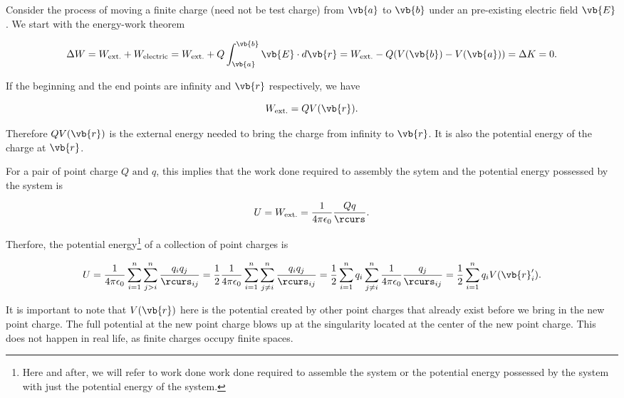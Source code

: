 \documentclass[english,a4paper,12pt]{report}
\begin{document}
Consider the process of moving a finite charge (need not be test charge) from \(\vb{a} \) to \(\vb{b} \) under an pre-existing electric field \(\vb{E} \). We start with the energy-work theorem

\begin{equation}
    \Delta W = W_{\text{ext.}} + W_{\text{electric}} = W_{\text{ext.}} + Q \int_{\vb{a} }^{\vb{b} } \vb{E} \cdot d\vb{r} = W_{\text{ext.}} - Q (V(\vb{b} ) - V(\vb{a} )) = \Delta K = 0.    
\end{equation}

If the beginning and the end points are infinity and \(\vb{r} \) respectively, we have

\begin{equation}
    W_{\text{ext.}} = QV(\vb{r} ). 
\end{equation}

Therefore \(QV(\vb{r} )\) is the external energy needed to bring the charge from infinity to \(\vb{r} \). It is also the potential energy of the charge at \(\vb{r} \). 

For a pair of point charge \(Q \text { and } q\), this implies that the work done required to assembly the sytem and the potential energy possessed by the system is 

\begin{equation}
    U = W_{\text{ext.}} = \frac{1}{4\pi \epsilon_0} \frac{Qq}{\rcurs }.
\end{equation}

Therfore, the potential energy\footnote{Here and after, we will refer to work done work done required to assemble the system or the potential energy possessed by the system with just the potential energy of the system.} of a collection of point charges is 

\begin{equation}
    U = \frac{1}{4\pi\epsilon_0} \sum_{i=1}^{n} \sum_{j>i}^{n} \frac{q_{i} q_{j} }{\rcurs _{ij} }  = \frac{1}{2} \frac{1}{4\pi\epsilon_0} \sum_{i=1}^{n} \sum_{j\neq i}^{n} \frac{q_{i} q_{j} }{\rcurs _{ij} } = \frac{1}{2} \sum_{i=1}^{n} q_{i} \sum_{j\neq i}^{n} \frac{1}{4\pi\epsilon_0} \frac{q_{j} }{\rcurs _{ij} } = \frac{1}{2} \sum_{i=1}^{n} q_{i} V(\vb{r}_i '). \label{energy2} 
\end{equation}

It is important to note that \(V(\vb{r} )\) here is the potential created by other point charges that already exist before we bring in the new point charge. The full potential at the new point charge blows up at the singularity located at the center of the new point charge. This does not happen in real life, as finite charges occupy finite spaces. 
\end{document}
